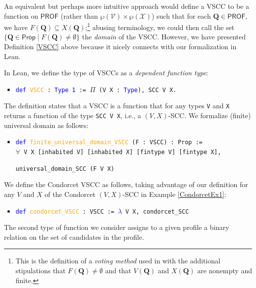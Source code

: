 \documentclass[runningheads]{llncs}
\begin{document}
\noindent An equivalent but perhaps more intuitive approach would define a VSCC to be a function on $\mathsf{PROF}$ (rather than $\wp(\mathcal{V})\times\wp(\mathcal{X})$) such that for each $\mathbf{Q}\in\mathsf{PROF}$, we have $F(\mathbf{Q})\subseteq X(\mathbf{Q})$;\footnote{This is the definition of a \textit{voting method} used in \cite{} with the additional stipulations that $F(\mathbf{Q})\neq\emptyset$ and  that $V(\mathbf{Q})$ and $X(\mathbf{Q})$ are nonempty and finite.} abusing terminology, we could then call the set $\{\mathbf{Q}\in\mathsf{Prop}\mid F(\mathbf{Q})\neq\emptyset\}$ the \emph{domain} of the VSCC. However, we have presented Definition \ref{VSCC} above because it nicely connects with our formalization in Lean.



In Lean, we define the type of VSCCs as a \textit{dependent function type}:
\begin{itemize}
\item[] \texttt{\textcolor{blue}{def} \textcolor{orange}{VSCC} : \textcolor{blue}{Type 1} := $\Pi$ (V X : \textcolor{blue}{Type}), SCC V X.}
\end{itemize}
The definition states that a VSCC is a function that for any types \texttt{V} and \texttt{X} returns a function of the type \texttt{SCC V X}, i.e., a $(V,X)$-SCC. We formalize (finite) universal domain as follows:
\begin{itemize}
\item[] \texttt{\textcolor{blue}{def} \textcolor{orange}{finite\_universal\_domain\_VSCC} (F : VSCC) : Prop :=}\\
    \texttt{$\forall$ V X [inhabited V] [inhabited X] [fintype V] [fintype X],}
    
    \texttt{universal\_domain\_SCC (F V X)}
\end{itemize}

\begin{example} We define the Condorcet VSCC as follows, taking advantage of our definition for any $V$ and $X$ of the Condorcet $(V,X)$-SCC in Example \ref{CondorcetEx1}:
\begin{itemize}
\item[] \texttt{\textcolor{blue}{def} \textcolor{orange}{condorcet\_VSCC} : VSCC := \textcolor{blue}{$\lambda$} V X, condorcet\_SCC}
\end{itemize}
\end{example}

The second type of function we consider assigns to a given profile a binary relation on the set of candidates in the profile. %
\end{document}
